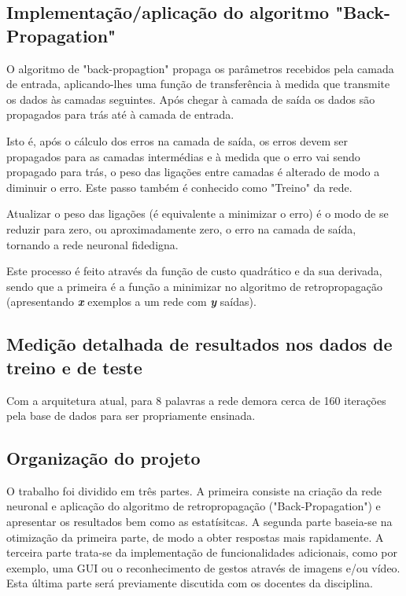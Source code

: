\documentclass[10pt,a4paper]{article}
\begin{document}
\subsection{Implementação/aplicação do algoritmo "Back-Propagation"}
\subitem

O algoritmo de "back-propagtion" propaga os parâmetros recebidos pela camada de entrada, aplicando-lhes uma função de transferência à medida que transmite os dados às camadas seguintes. Após chegar à camada de saída os dados são propagados para trás até à camada de entrada.

Isto é, após o cálculo dos erros na camada de saída, os erros devem ser propagados para as camadas intermédias e à medida que o erro vai sendo propagado para trás, o peso das ligações entre camadas é alterado de modo a diminuir o erro. Este passo também é conhecido como "Treino" da rede.

Atualizar o peso das ligações (é equivalente a minimizar o erro) é o modo de se reduzir para zero, ou aproximadamente zero, o erro na camada de saída, tornando a rede neuronal fidedigna.

Este processo é feito através da função de custo quadrático e da sua derivada, sendo que a primeira é a função a minimizar no algoritmo de retropropagação (apresentando \textbf{\textit{x}} exemplos a um rede com \textbf{\textit{y}} saídas).


\subsection{Medição detalhada de resultados nos dados de treino e de teste}
\subitem

Com a arquitetura atual, para 8 palavras a rede demora cerca de 160 iterações pela base de dados para ser propriamente ensinada.

\subsection{Organização do projeto}
\subitem

O trabalho foi dividido em três partes. 
A primeira consiste na criação da rede neuronal e aplicação do algoritmo de retropropagação ("Back-Propagation") e apresentar os resultados bem como as estatísitcas.
A segunda parte baseia-se na otimização da primeira parte, de modo a obter respostas mais rapidamente.
A terceira parte trata-se da implementação de funcionalidades adicionais, como por exemplo, uma GUI ou o reconhecimento de gestos através de imagens e/ou vídeo. Esta última parte será previamente discutida com os docentes da disciplina.
\end{document}
